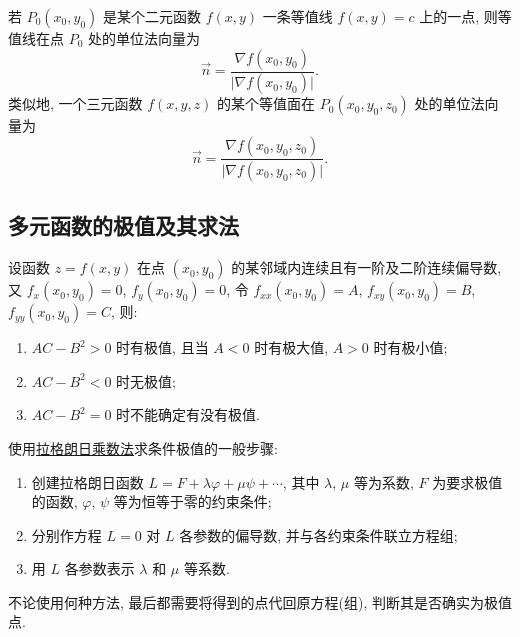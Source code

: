 \documentclass[a4paper,10pt,fleqn]{article}
\begin{document}
\begin{attn}
    若 $P_0(x_0,y_0)$ 是某个二元函数 $f(x,y)$ 一条等值线 $f(x,y)=c$ 上的一点, 则等值线在点 $P_0$ 处的单位法向量为
    \[
        \vec{n}=\frac{\nabla f(x_0,y_0)}{\lvert\nabla f(x_0,y_0)\rvert}.
    \]
    类似地, 一个三元函数 $f(x,y,z)$ 的某个等值面在 $P_0(x_0,y_0,z_0)$ 处的单位法向量为
    \[
        \vec{n}=\frac{\nabla f(x_0,y_0,z_0)}{\lvert\nabla f(x_0,y_0,z_0)\rvert}.
    \]
\end{attn}

\subsection{多元函数的极值及其求法}

\begin{thm}[极值充分条件]
    设函数 $z=f(x,y)$ 在点 $(x_0,y_0)$ 的某邻域内连续且有一阶及二阶连续偏导数, 又 $f_x(x_0,y_0)=0$, $f_y(x_0,y_0)=0$, 令
    $f_{xx}(x_0,y_0)=A$, $f_{xy}(x_0,y_0)=B$, $f_{yy}(x_0,y_0)=C$, 则:
    \begin{enumerate}[(1)]
        \item $AC-B^2>0$ 时有极值, 且当 $A<0$ 时有极大值, $A>0$ 时有极小值;
        \item $AC-B^2<0$ 时无极值;
        \item $AC-B^2=0$ 时不能确定有没有极值.
    \end{enumerate}
\end{thm}

使用\uline{拉格朗日乘数法}求条件极值的一般步骤:
\begin{enumerate}
    \item 创建拉格朗日函数 $L=F+\lambda\varphi+\mu\psi+\cdots$, 其中 $\lambda$, $\mu$ 等为系数, $F$ 为要求极值的函数,
          $\varphi$, $\psi$ 等为恒等于零的约束条件;
    \item 分别作方程 $L=0$ 对 $L$ 各参数的偏导数, 并与各约束条件联立方程组;
    \item 用 $L$ 各参数表示 $\lambda$ 和 $\mu$ 等系数.
\end{enumerate}

\begin{attn}
    不论使用何种方法, 最后都需要将得到的点代回原方程(组), 判断其是否确实为极值点.
\end{attn}
\end{document}
